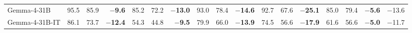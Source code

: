 \begin{table}[ht!]
{\begin{tabular}{@{}l rrr rrr rrr rrr rrr r@{}}
Gemma-4-31B                  & 95.5 & 85.9 & \textbf{{\boldmath$-$}9.6} & 85.2 & 72.2 & \textbf{{\boldmath$-$}13.0} & 93.0 & 78.4 & \textbf{{\boldmath$-$}14.6} & 92.7 & 67.6 & \textbf{{\boldmath$-$}25.1} & 85.0 & 79.4 & \textbf{{\boldmath$-$}5.6} & $-$13.6 \\
Gemma-4-31B-IT               & 86.1 & 73.7 & \textbf{{\boldmath$-$}12.4} & 54.3 & 44.8 & \textbf{{\boldmath$-$}9.5} & 79.9 & 66.0 & \textbf{{\boldmath$-$}13.9} & 74.5 & 56.6 & \textbf{{\boldmath$-$}17.9} & 61.6 & 56.6 & \textbf{{\boldmath$-$}5.0} & $-$11.7 \\
\bottomrule
\end{tabular}}
\end{table}
